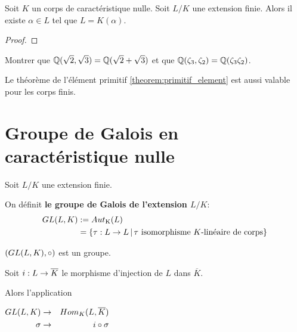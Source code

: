 

\begin{theorem} 
	\label{theorem:primitif_element}
	Soit $K$ un corps de caractéristique nulle.
	Soit $L/K$ une extension finie. Alors il existe $\alpha \in L$ tel que $L =
	K(\alpha)$.
\end{theorem}

\ifdefined\outputproof
\begin{proof}

\end{proof}
\fi

\begin{exercice}
	Montrer que $\mathbb{Q}(\sqrt{2}, \sqrt{3}) = \mathbb{Q}(\sqrt{2} + \sqrt{3})$
	et que $\mathbb{Q}(\zeta_{3}, \zeta_{2}) = \mathbb{Q}(\zeta_{3} \zeta_{2})$.
\end{exercice}

\begin{remarque}
	Le théorème de l'élément primitif \ref{theorem:primitif_element} est aussi
	valable pour les corps finis.
\end{remarque}

\section{Groupe de Galois en caractéristique nulle}

\begin{definition} 
	Soit $L/K$ une extension finie.

	On définit \textbf{le groupe de Galois de l'extension $L/K$}:
	\begin{align*}
		GL(L, K) & := Aut_{\text{K}}(L) \\
		& = \left\{\tau : L \rightarrow L \, | \, \text{$\tau$ isomorphisme
		$K$-linéaire de corps} \right\}
	\end{align*}

	$(GL(L, K), \circ)$ est un groupe.
\end{definition}

Soit $i : L \rightarrow \overline{K}$ le morphisme d'injection de $L$ dans
$\overline{K}$.

Alors l'application

\begin{center}
$
\begin{aligned}
	GL(L, K) &\rightarrow& Hom_{K}(L, \overline{K}) \\
	\sigma &\rightarrow& i \circ \sigma
\end{aligned}
$
\end{center}

